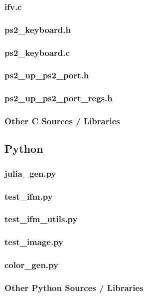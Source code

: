 \documentclass{article}
\begin{document}
\subsubsection{ifv.c}								%
\subsubsection{ps2\_keyboard.h}					%
\subsubsection{ps2\_keyboard.c}					%
\subsubsection{ps2\_up\_ps2\_port.h}				%
\subsubsection{ps2\_up\_ps2\_port\_regs.h}			%
\subsubsection{Other C Sources / Libraries}

\subsection{Python}
\subsubsection{julia\_gen.py}						%
\subsubsection{test\_ifm.py}						%
\subsubsection{test\_ifm\_utils.py}				%
\subsubsection{test\_image.py} 					%
\subsubsection{color\_gen.py} 						%
\subsubsection{Other Python Sources / Libraries}
\end{document}
